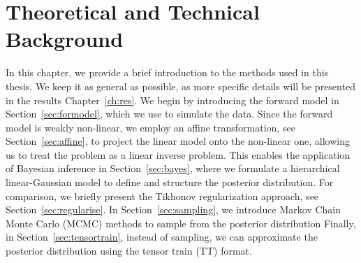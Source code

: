 \the\columnwidth
\chapter{Theoretical and Technical Background}
\label{ch:background}
In this chapter, we provide a brief introduction to the methods used in this thesis. We keep it as general as possible, as more specific details will be presented in the results Chapter~\ref{ch:res}.
We begin by introducing the forward model in Section~\ref{sec:formodel}, which we use to simulate the data. Since the forward model is weakly non-linear, we employ an affine transformation, see Section~\ref{sec:affine}, to project the linear model onto the non-linear one, allowing us to treat the problem as a linear inverse problem.
This enables the application of Bayesian inference in Section~\ref{sec:bayes}, where we formulate a hierarchical linear-Gaussian model to define and structure the posterior distribution.
For comparison, we briefly present the Tikhonov regularization approach, see Section~\ref{sec:regularise}.
In Section~\ref{sec:sampling}, we introduce Markov Chain Monte Carlo (MCMC) methods to sample from the posterior distribution
Finally, in Section~\ref{sec:tensortrain}, instead of sampling, we can approximate the posterior distribution using the tensor train (TT) format.






